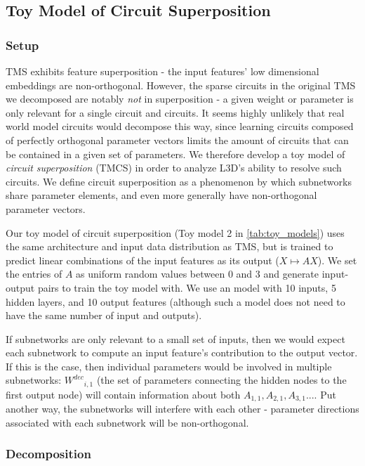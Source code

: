 \documentclass{article}
\theoremstyle{plain}
\theoremstyle{definition}
\theoremstyle{remark}
\begin{document}
\subsection{Toy Model of Circuit Superposition}

\subsubsection{Setup}

TMS exhibits feature superposition - the input features' low dimensional embeddings are non-orthogonal. However, the sparse circuits in the original TMS we decomposed are notably \textit{not} in superposition - a given weight or parameter is only relevant for a single circuit and circuits. It seems highly unlikely that real world model circuits would decompose this way, since learning circuits composed of perfectly orthogonal parameter vectors limits the amount of circuits that can be contained in a given set of parameters. We therefore develop a toy model of \textit{circuit superposition} (TMCS) in order to analyze L3D's ability to resolve such circuits. We define circuit superposition as a phenomenon by which subnetworks share parameter elements, and even more generally have non-orthogonal parameter vectors.

Our toy model of circuit superposition (Toy model 2 in \ref{tab:toy_models}) uses the same architecture and input data distribution as TMS, but is trained to predict linear combinations of the input features as its output ($X \mapsto A X$). We set the entries of $A$  as uniform random values between 0 and 3 and generate input-output pairs to train the toy model with. We use an model with 10 inputs, 5 hidden layers, and 10 output features (although such a model does not need to have the same number of input and outputs).

If subnetworks are only relevant to a small set of inputs, then we would expect each subnetwork to compute  an input feature's contribution to the output vector. If this is the case, then individual parameters would be involved in multiple subnetworks: ${W^{dec}}_{i,1}$ (the set of parameters connecting the hidden nodes to the first output node) will contain information about both $A_{1,1}, A_{2,1}, A_{3,1}...$.  Put another way, the subnetworks will interfere with each other - parameter directions associated with each subnetwork will be non-orthogonal. 

\subsubsection{Decomposition}
\end{document}
